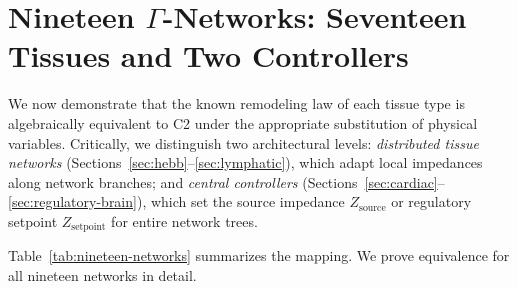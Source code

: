 \documentclass[aps,pre,twocolumn,superscriptaddress,floatfix]{revtex4-2}
\begin{document}
\section{Nineteen $\Gamma$-Networks: Seventeen Tissues and Two Controllers}
\label{sec:nineteen-networks}

We now demonstrate that the known remodeling law of each
tissue type is algebraically equivalent to C2 under the
appropriate substitution of physical variables.
Critically, we distinguish two architectural levels:
\emph{distributed tissue networks} (Sections~\ref{sec:hebb}--\ref{sec:lymphatic}),
which adapt local impedances along network branches; and
\emph{central controllers} (Sections~\ref{sec:cardiac}--\ref{sec:regulatory-brain}),
which set the source impedance $Z_{\text{source}}$ or
regulatory setpoint $Z_{\text{setpoint}}$ for entire
network trees.

Table~\ref{tab:nineteen-networks} summarizes the mapping.
We prove equivalence for all nineteen networks in detail.
\end{document}
